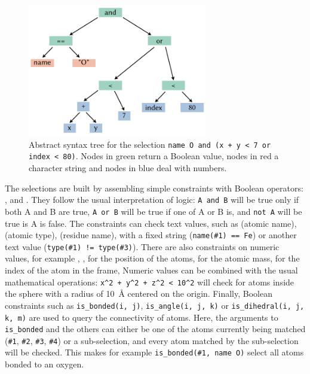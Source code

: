 \documentclass[thesis]{subfiles}
\begin{document}
\begin{figure}[ht]
    \centering
    \includegraphics[width=0.7\textwidth]{figures/images/chemfiles-selection-ast}
    \caption{Abstract syntax tree for the selection \texttt{name O and (x + y <
    7 or index < 80)}. Nodes in green return a Boolean value, nodes in red a
    character string and nodes in blue deal with numbers.}
    \label{fig:chemfiles:selection-ast}
\end{figure}

The selections are built by assembling simple constraints with Boolean operators:
,  and . They follow the usual interpretation of
logic: \texttt{A and B} will be true only if both A and B are true, \texttt{A or
B} will be true if one of A or B is, and \texttt{not A} will be true is A is
false. The constraints can check text values, such as  (atomic name),
 (atomic type),  (residue name), with a fixed string
(\texttt{name(\#1) == Fe}) or another text value (\texttt{type(\#1) !=
type(\#3)}). There are also constraints on numeric values, for example ,
,  for the position of the atoms,  for the atomic
mass,  for the index of the atom in the frame, \etc Numeric values
can be combined with the usual mathematical operations: \texttt{x\^{}2 + y\^{}2
+ z\^{}2 < 10\^{}2} will check for atoms inside the sphere with a radius of
\SI{10}{\AA} centered on the origin. Finally, Boolean constraints such as
\texttt{is\_bonded(i, j)}, \texttt{is\_angle(i, j, k)} or
\texttt{is\_dihedral(i, j, k, m)} are used to query the connectivity of atoms.
Here, the arguments to \texttt{is\_bonded} and the others can either be one of
the atoms currently being matched (\texttt{\#1}, \texttt{\#2}, \texttt{\#3},
\texttt{\#4}) or a sub-selection, and every atom matched by the sub-selection
will be checked. This makes for example \texttt{is\_bonded(\#1, name O)} select
all atoms bonded to an oxygen.
\end{document}
